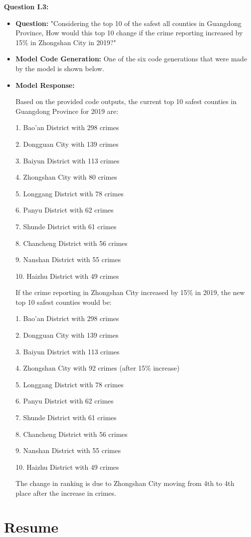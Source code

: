 \noindent\textbf{Question I.3:}
\begin{itemize}
  \item \textbf{Question:} "Considering the top 10 of the safest all counties in Guangdong Province, How would this top 10 change if the crime reporting increased by 15\% in Zhongshan City in 2019?"
  
  \item \textbf{Model Code Generation:} One of the six code generations that were made by the model is shown below.
  
      
  \item \textbf{Model Response:} 
  \begin{tcolorbox}[colback=white!95!black, colframe=black, title=Q3 Response, fontupper=\scriptsize, boxsep=2pt, left=3pt, right=3pt]
  Based on the provided code outputs, the current top 10 safest counties in Guangdong Province for 2019 are:

  1. Bao'an District with 298 crimes

  2. Dongguan City with 139 crimes
  
  3. Baiyun District with 113 crimes
  
  4. Zhongshan City with 80 crimes
  
  5. Longgang District with 78 crimes
  
  6. Panyu District with 62 crimes
  
  7. Shunde District with 61 crimes
  
  8. Chancheng District with 56 crimes
  
  9. Nanshan District with 55 crimes
  
  10. Haizhu District with 49 crimes

  If the crime reporting in Zhongshan City increased by 15\% in 2019, the new top 10 safest counties would be:

  1. Bao'an District with 298 crimes

  2. Dongguan City with 139 crimes

  3. Baiyun District with 113 crimes

  4. Zhongshan City with 92 crimes (after 15\% increase)

  5. Longgang District with 78 crimes

  6. Panyu District with 62 crimes

  7. Shunde District with 61 crimes

  8. Chancheng District with 56 crimes

  9. Nanshan District with 55 crimes

  10. Haizhu District with 49 crimes

  The change in ranking is due to Zhongshan City moving from 4th to 4th place after the increase in crimes.
  \end{tcolorbox}

      
\end{itemize}




\section{Resume}

